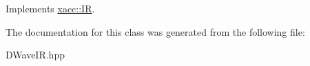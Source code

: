Implements \hyperlink{a00167_a8356cdff1919b88eabeb84fd7450cdb6}{xacc\+::\+IR}.



The documentation for this class was generated from the following file\+:\begin{DoxyCompactItemize}
\item 
D\+Wave\+I\+R.\+hpp\end{DoxyCompactItemize}
